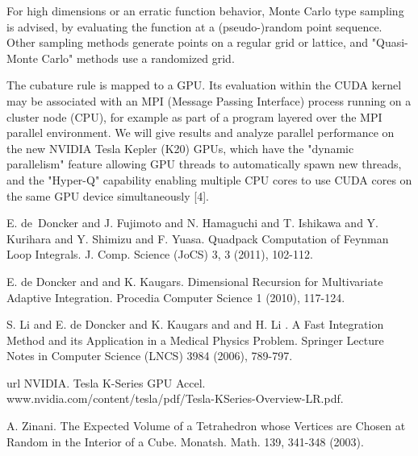 \documentclass[article,A4,11pt]{llncs}%
\begin{document}
For high dimensions or an erratic function behavior, Monte Carlo type sampling is advised, by evaluating the function at a (pseudo-)random point sequence. Other sampling methods generate points on a regular grid or lattice, and "Quasi-Monte Carlo" methods use a randomized grid. 

The cubature rule is mapped to a GPU. Its evaluation within the CUDA kernel may be associated with an MPI (Message Passing Interface) process running on a cluster node (CPU), for example as part of a program layered over the MPI parallel environment. 
We will give results and analyze parallel performance on the new NVIDIA Tesla Kepler (K20) GPUs, which have the "dynamic parallelism" feature allowing GPU threads to automatically spawn new threads, and the "Hyper-Q" capability enabling multiple CPU cores to use CUDA cores on the same GPU device simultaneously [4].



\begin{thebibliography}{10}
{\sc E. de~Doncker and J. Fujimoto and N. Hamaguchi and T. Ishikawa and Y. Kurihara and Y. Shimizu and F. Yuasa}. {Quadpack Computation of Feynman Loop Integrals}. J. Comp. Science (JoCS) 3, 3 (2011), 102-112.

{\sc E. de Doncker and and K. Kaugars}. {Dimensional Recursion for Multivariate Adaptive Integration}. Procedia Computer Science 1 (2010), 117-124.

{\sc S. Li and E. de Doncker and K. Kaugars and and H. Li }. {A Fast Integration Method and its Application in a Medical Physics Problem}. Springer Lecture Notes in Computer Science (LNCS) 3984 (2006), 789-797.

{\sc url NVIDIA}. {Tesla K-Series GPU Accel}. www.nvidia.com/content/tesla/pdf/Tesla-KSeries-Overview-LR.pdf.

{\sc A. Zinani}. {The Expected Volume of a Tetrahedron whose Vertices are Chosen at Random in the Interior of a Cube}. Monatsh. Math. 139, 341-348 (2003).
\end{thebibliography}
\end{document}
